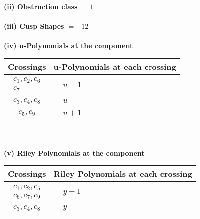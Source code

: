 \documentclass[1p]{elsarticle_modified}
\theoremstyle{definition}
\begin{document}
\flushleft \textbf{(ii) Obstruction class $= 1$}\\~\\
\flushleft \textbf{(iii) Cusp Shapes $= -12$}\\~\\
\newpage\renewcommand{\arraystretch}{1}
\flushleft \textbf{(iv) u-Polynomials at the component}\newline \\
\begin{tabular}{m{50pt}|m{274pt}}
Crossings & \hspace{64pt}u-Polynomials at each crossing \\
\hline $$\begin{aligned}c_{1},c_{2},c_{6}\\c_{7}\end{aligned}$$&$\begin{aligned}
&u-1
\end{aligned}$\\
\hline $$\begin{aligned}c_{3},c_{4},c_{8}\end{aligned}$$&$\begin{aligned}
&u
\end{aligned}$\\
\hline $$\begin{aligned}c_{5},c_{9}\end{aligned}$$&$\begin{aligned}
&u+1
\end{aligned}$\\
\hline
\end{tabular}\\~\\
\newpage\renewcommand{\arraystretch}{1}
\flushleft \textbf{(v) Riley Polynomials at the component}\newline \\
\begin{tabular}{m{50pt}|m{274pt}}
Crossings & \hspace{64pt}Riley Polynomials at each crossing \\
\hline $$\begin{aligned}c_{1},c_{2},c_{5}\\c_{6},c_{7},c_{9}\end{aligned}$$&$\begin{aligned}
&y-1
\end{aligned}$\\
\hline $$\begin{aligned}c_{3},c_{4},c_{8}\end{aligned}$$&$\begin{aligned}
&y
\end{aligned}$\\
\hline
\end{tabular}\\~\\
\end{document}
